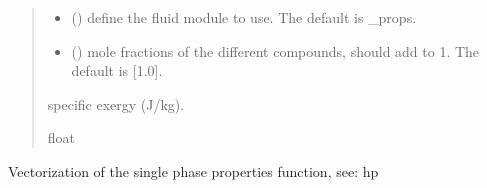 \documentclass[letterpaper,10pt,english]{sphinxmanual}
\begin{document}
\begin{fulllineitems}
\begin{quote}
\begin{description}
\begin{itemize}
\item {} 
\sphinxAtStartPar
{} (\sphinxstyleliteralemphasis{\sphinxupquote{, }}) \textendash{} define the fluid module to use. The default is \_props.

\item {} 
\sphinxAtStartPar
{} (\sphinxstyleliteralemphasis{\sphinxupquote{, }}) \textendash{} mole fractions of the different compounds, should add to 1.
The default is {[}1.0{]}.

\end{itemize}

\sphinxAtStartPar
{} \textendash{} specific exergy (J/kg).

\sphinxAtStartPar
float

\end{description}\end{quote}

\end{fulllineitems}


\begin{fulllineitems}
\label{\detokenize{fluid_properties_rp:fluid_properties_rp.hp_v}}
\pysigstartsignatures
{}
\pysigstopsignatures
\sphinxAtStartPar
Vectorization of the single phase properties function, see: hp

\end{fulllineitems}

\end{document}
